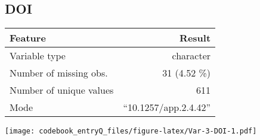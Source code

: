 \documentclass[]{article}
\newcommand{\fullline}{\noindent\makebox[\linewidth]{\rule{\textwidth}{0.4pt}}}
\newcommand{\bminione}{\begin{minipage}{0.75 \textwidth}}
\newcommand{\bminitwo}{\begin{minipage}{0.25 \textwidth}}
\newcommand{\emini}{\end{minipage}}
\begin{document}
\fullline

\hypertarget{doi}{\subsection{DOI}\label{doi}}

\bminione

\begin{longtable}[]{@{}lr@{}}
\toprule
\begin{minipage}[b]{0.34\columnwidth}\raggedright\strut
Feature\strut
\end{minipage} & \begin{minipage}[b]{0.29\columnwidth}\raggedleft\strut
Result\strut
\end{minipage}\tabularnewline
\midrule
\endhead
\begin{minipage}[t]{0.34\columnwidth}\raggedright\strut
Variable type\strut
\end{minipage} & \begin{minipage}[t]{0.29\columnwidth}\raggedleft\strut
character\strut
\end{minipage}\tabularnewline
\begin{minipage}[t]{0.34\columnwidth}\raggedright\strut
Number of missing obs.\strut
\end{minipage} & \begin{minipage}[t]{0.29\columnwidth}\raggedleft\strut
31 (4.52 \%)\strut
\end{minipage}\tabularnewline
\begin{minipage}[t]{0.34\columnwidth}\raggedright\strut
Number of unique values\strut
\end{minipage} & \begin{minipage}[t]{0.29\columnwidth}\raggedleft\strut
611\strut
\end{minipage}\tabularnewline
\begin{minipage}[t]{0.34\columnwidth}\raggedright\strut
Mode\strut
\end{minipage} & \begin{minipage}[t]{0.29\columnwidth}\raggedleft\strut
``10.1257/app.2.4.42''\strut
\end{minipage}\tabularnewline
\bottomrule
\end{longtable}

\emini
\bminitwo
\texttt{[image: codebook\_entryQ\_files/figure-latex/Var-3-DOI-1.pdf]}
\emini
\end{document}
